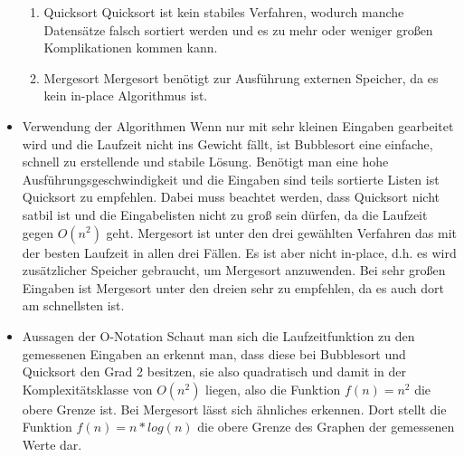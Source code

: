 \begin{itemize}
\begin{enumerate}
				\item Quicksort
					Quicksort ist kein stabiles Verfahren, wodurch manche Datensätze falsch sortiert werden und es zu mehr oder weniger großen Komplikationen kommen kann. 
				\item Mergesort
					Mergesort benötigt zur Ausführung externen Speicher, da es kein in-place Algorithmus ist.  
			\end{enumerate}
		\item Verwendung der Algorithmen 
			Wenn nur mit sehr kleinen Eingaben gearbeitet wird und die Laufzeit nicht ins Gewicht fällt, ist Bubblesort eine einfache, schnell zu erstellende und stabile Lösung.
	Benötigt man eine hohe Ausführungsgeschwindigkeit und die Eingaben sind teils sortierte Listen ist Quicksort zu empfehlen. Dabei muss beachtet werden, dass Quicksort nicht satbil
		ist und die Eingabelisten nicht zu groß sein dürfen, da die Laufzeit gegen $O(n^2)$ geht.
	Mergesort ist unter den drei gewählten Verfahren das mit der besten Laufzeit in allen drei Fällen. Es ist aber nicht in-place, d.h. es wird zusätzlicher Speicher gebraucht, um Mergesort anzuwenden. Bei sehr großen Eingaben ist Mergesort unter den dreien sehr zu empfehlen, da es auch dort am schnellsten ist.
		\item Aussagen der O-Notation
	Schaut man sich die Laufzeitfunktion zu den gemessenen Eingaben an erkennt man, dass diese bei Bubblesort und Quicksort den Grad 2 besitzen, sie also quadratisch und damit in der Komplexitätsklasse 
		von $O(n^2)$ liegen, also die Funktion $f(n)=n^2$ die obere Grenze ist.
	Bei Mergesort lässt sich ähnliches erkennen. Dort stellt die Funktion $f(n)=n*log(n)$ die obere Grenze des Graphen der gemessenen Werte dar.

	\end{itemize}

